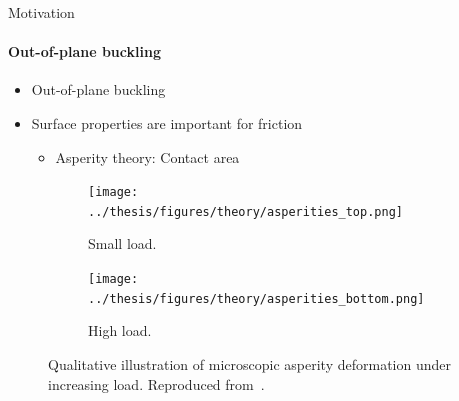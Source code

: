 \documentclass[
	10pt, %
]{beamer}
\begin{document}
\begin{frame}{Motivation}
	\framesubtitle{Out-of-plane buckling}
	\vspace{0.5cm}
	
	\begin{itemize}
		\item Out-of-plane buckling
		\item Surface properties are important for friction
		\begin{itemize}
			\item Asperity theory: Contact area
		\end{itemize}
	\end{itemize}

	\begin{figure}[H]
		\centering
		\begin{subfigure}[b]{0.49\textwidth}
			\centering
			\texttt{[image: ../thesis/figures/theory/asperities\_top.png]}
			\caption{Small load.}
			\label{fig:asp_left}
		\end{subfigure}
		\hfill
		\begin{subfigure}[b]{0.49\textwidth}
			\centering
			\texttt{[image: ../thesis/figures/theory/asperities\_bottom.png]}
			\caption{High load.}
			\label{fig:asp_right}
		\end{subfigure}
		\caption{Qualitative illustration of microscopic asperity deformation under increasing load. Reproduced from~\cite{wiki:asperities}.}
	\end{figure}
\end{frame}
%
%
%
%
\end{document}
